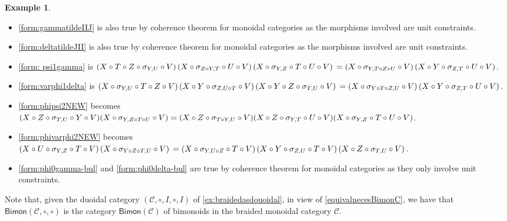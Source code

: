 \documentclass[nosumlimits,twoside]{amsart}
\theoremstyle{definition}
\newtheorem{example}[example]{\sc Example}
\theoremstyle{remark}
\newenvironment{invisible}{{\noindent\sc \colorbox{yellow}{Invisible:}\;}\color{gray}}{\medskip}
\newcommand{\Cc}{\mathcal{C}}
\begin{document}
\begin{example}
\begin{invisible}
\begin{itemize}
\item \eqref{form:gammatildeIIJ} is also true by coherence theorem for
monoidal categories as the morphisms involved are unit constraints.

\item \eqref{form:deltatildeJII} is also true by coherence theorem for
monoidal categories as the morphisms involved are unit constraints.

\item \eqref{form: psi1gamma} is $\left( X\circ T\circ Z\circ \sigma
_{Y,U}\circ V\right) \left( X\circ \sigma _{Z\circ Y,T}\circ U\circ V\right)
\left( X\circ \sigma _{Y,Z}\circ T\circ U\circ V\right) \\=\left( X\circ
\sigma _{Y,T\circ Z\circ U}\circ V\right) \left( X\circ Y\circ \sigma
_{Z,T}\circ U\circ V\right) $.

\item \eqref{form:varphi1delta} is $\left( X\circ \sigma _{Y,U}\circ T\circ
Z\circ V\right) \left( X\circ Y\circ \sigma _{Z,U\circ T}\circ V\right)
\left( X\circ Y\circ Z\circ \sigma _{T,U}\circ V\right) \\=\left( X\circ
\sigma _{Y\circ T\circ Z,U}\circ V\right) \left( X\circ Y\circ \sigma
_{Z,T}\circ U\circ V\right) .$
\item \eqref{form:phipsi2NEW} becomes $(X\circ Z\circ \sigma_{T,U}\circ Y\circ V)(X\circ \sigma_{Y,Z\circ T\circ U}\circ V)\\=(X\circ Z\circ \sigma_{T\circ Y,U}\circ V)(X\circ Z\circ \sigma_{Y,T}\circ U\circ V)(X\circ \sigma_{Y,Z}\circ T\circ U\circ V)$.
\item \eqref{form:phivarphi2NEW} becomes $\left( X\circ U\circ \sigma _{Y,Z}\circ T\circ V\right) \left( X\circ
\sigma _{Y\circ Z\circ T,U}\circ V\right) \\=\left( X\circ \sigma _{Y,U\circ
Z}\circ T\circ V\right) \left( X\circ Y\circ \sigma _{Z,U}\circ T\circ
V\right) \left( X\circ Z\circ \sigma _{T,U}\circ V\right) $.
\item \eqref{form:phi0gamma-bul} and \eqref{form:phi0delta-bul} are true by coherence theorem for
monoidal categories as they only  involve unit constraints.
\end{itemize}
\end{invisible}
\end{example}

Note that, given the duoidal category $(\Cc,\circ,I,\circ,I)$ of \cref{ex:braidedasdouoidal}, in view of \eqref{equivalnecesBimonC}, we have that $\mathsf{Bimon}(\Cc,\circ,\circ)$ is the category $\mathsf{Bimon}(\Cc)$ of bimonoids in the braided monoidal category $\Cc$. 
\end{document}

